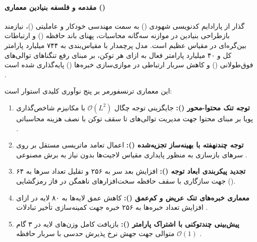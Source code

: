 \item {}

\paragraph*{مقدمه و فلسفه بنیادین معماری ()}
گذار از پارادایم کدنویسی شهودی () به سمت مهندسی خودکار و عاملیتی ()، نیازمند بازطراحی بنیادین در موازنه سه‌گانه محاسبات، پهنای باند حافظه () و ارتباطات بین‌گره‌ای در مقیاس عظیم است. مدل پرچمدار  با مقیاس‌بندی به ۷۴۴ میلیارد پارامتر کل و ۴۰ میلیارد پارامتر فعال به ازای هر توکن، بر مبنای رفع تنگناهای توالی‌های فوق‌طولانی () و کاهش سربار ارتباطی در موازی‌سازی خبره‌ها () پایه‌گذاری شده است \cite{glm5_2026}. 

این معماری ترنسفورمر بر پنج نوآوری کلیدی استوار است:
\begin{enumerate}
    \item \textbf{توجه تنک محتوا-محور ():} جایگزینی توجه چگال $\mathcal{O}(L^2)$ با مکانیزم شاخص‌گذاری پویا بر مبنای محتوا جهت مدیریت توالی‌های تا سقف  توکن با نصف هزینه محاسباتی \cite{deepseek2025v32}.
    \item \textbf{توجه چندنهفته با بهینه‌ساز تجزیه‌شده ():} اعمال تعامد ماتریسی مستقل بر روی سرهای بازسازی به منظور پایداری مقیاس لاجیت‌ها بدون نیاز به برش مصنوعی \cite{liu2024deepseekv2, jordan2024muon}.
    \item \textbf{تجدید پیکربندی ابعاد توجه ():} افزایش بعد سر به ۲۵۶ و تقلیل تعداد سرها به ۶۴ جهت سازگاری با سقف حافظه سخت‌افزارهای ناهمگن در فاز رمزگشایی ().
    \item \textbf{معماری خبره‌های تنک عریض و کم‌عمق ():} کاهش عمق لایه‌ها به ۸۰ لایه در ازای افزایش تعداد خبره‌ها به ۲۵۶ خبره جهت کمینه‌سازی تأخیر تبادلات .
    \item \textbf{پیش‌بینی چندتوکنی با اشتراک پارامتر ():} بازیافت کامل وزن‌های لایه  در ۳ گام متوالی جهت جهش نرخ پذیرش حدسی با سربار حافظه $\mathcal{O}(1)$ \cite{gloeckle2024better}.
\end{enumerate}

